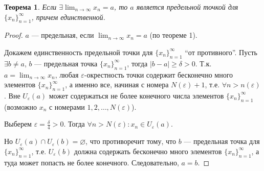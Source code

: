 \documentclass[a4paper,12pt]{article} %
\newtheorem{theorem}{Теорема}[section]
\theoremstyle{remark}
\theoremstyle{definition}
\begin{document}
\begin{theorem}
	Если $\exists \lim_{n \to \infty} x_n = a$, то $a$ является предельной точкой для $\{x_n\}_{n=1}^{\infty}$, причем единственной.
\end{theorem}

\begin{proof}
	$a$ --- предельная, если $\lim_{n \to \infty} x_n = a$ (по теореме 1).

Докажем единственность предельной точки для $\{x_n\}_{n=1}^{\infty}$ ``от противного''. Пусть $\exists b\neq a$, $b$ --- предельная точка $\{x_n\}_{n=1}^{\infty}$, тогда $|b-a|\ge \delta>0$. Т.к. $a=\lim_{n \to \infty} x_n$, любая $\varepsilon$-окрестность точки содержит бесконечно много элементов $\{x_n\}_{n=1}^{\infty}$, а именно все, начиная с номера $N(\varepsilon) + 1$, т.е. $\forall n>n(\varepsilon)$. Вне $U_\varepsilon(a)$ может содержаться не более конечного числа элементов $\{x_n\}_{n=1}^{\infty}$ (возможно $x_n$ с номерами $1, 2, \ldots, N(\varepsilon)$).

Выберем $\varepsilon=\frac{\delta}{4} > 0$. Тогда $\forall n>N(\varepsilon) : x_n \in  U_\varepsilon(a)$. 

\begin{center}
\end{center}

Но $U_\varepsilon(a)\cap U_\varepsilon(b) = \varnothing$, что противоречит тому, что $b$ --- предельная точка для $\{x_n\}_{n=1}^{\infty}$, т.е. $U_\varepsilon(b)$ должна содержать бесконечно много элементов $\{x_n\}_{n=1}^{\infty}$, а туда может попасть не более конечного. Следовательно, $a = b$.
\end{proof}
\end{document}
